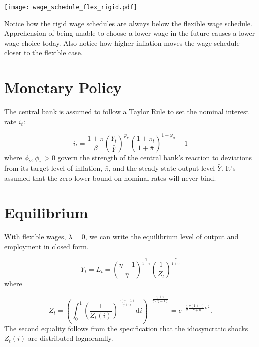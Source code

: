 \documentclass[12pt,a4paper]{scrartcl}            %
\begin{document}
\begin{center}
  \noindent \texttt{[image: wage\_schedule\_flex\_rigid.pdf]}  %
  \label{fig:wage_schedules}
\end{center}
%
Notice how the rigid wage schedules are always below the flexible wage schedule.
Apprehension of being unable to choose a lower wage in the future causes a lower wage choice today.
Also notice how higher inflation moves the wage schedule closer to the flexible case.


\section{Monetary Policy}
\label{sec:monetary_policy}

The central bank is assumed to follow a Taylor Rule to set the nominal interest rate $i_t$:

\begin{equation}
    \label{eq:taylor_rule}
    i_t = \frac{1 + \bar{\pi}}{\beta} \left( \frac{Y_t}{\bar{Y}} \right)^{\varphi_Y} \left( \frac{1 + \pi_t}{1 + \bar{\pi}} \right)^{1 + \varphi_{\pi}} - 1
\end{equation}
%
where $\phi_Y, \phi_{\pi} > 0$ govern the strength of the central bank's reaction to deviations from its target level of inflation, $\bar{\pi}$, and the steady-state output level $\bar{Y}$.
It's assumed that the zero lower bound on nominal rates will never bind.

\section{Equilibrium}
\label{sec:equilibrium}

With flexible wages, $\lambda = 0$, we can write the equilibrium level of output and employment in closed form.

\begin{equation}
    \label{eq:output_flexible}
    Y_t = L_t = \left( \frac{\eta - 1}{\eta} \right)^{\frac{\gamma}{1 + \gamma}} \left( \frac{1}{Z_t} \right)^{\frac{\gamma}{1 + \gamma}}
\end{equation}
%
where

\begin{equation}
    Z_t = \left( \int_{0}^{1}\! \left( \frac{1}{Z_t(i)} \right)^{\frac{\gamma(\eta - 1)}{\eta + \gamma}} \mathrm{d}i \right)^{-\frac{\eta + \gamma}{\gamma(\eta - 1)}} \!\!\! = e^{-\frac{1}{2} \frac{\eta(1 + \gamma)}{\gamma + \eta}\sigma^2 }.
\end{equation}
%
The second equality follows from the specification that the idiosyncratic shocks $Z_t(i)$ are distributed lognoramlly.
\end{document}
